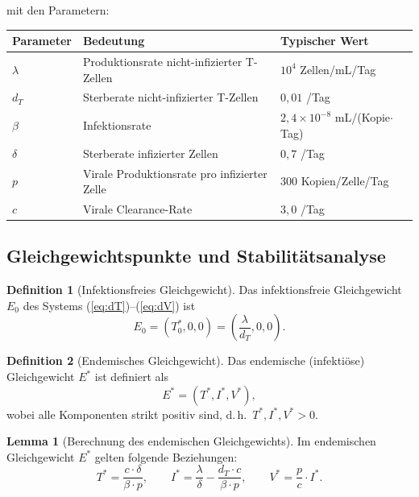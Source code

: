 ﻿\documentclass[a4paper,12pt]{article}
\theoremstyle{definition}
\newtheorem{definition}{Definition}
\newtheorem{lemma}{Lemma}
\begin{document}
mit den Parametern:
\begin{center}
\begin{tabular}{lll}
\toprule
\textbf{Parameter} & \textbf{Bedeutung} & \textbf{Typischer Wert} \\
\midrule
$\lambda$  & Produktionsrate nicht-infizierter T-Zellen  & $10^4$ Zellen/mL/Tag \\
$d_T$      & Sterberate nicht-infizierter T-Zellen       & $0{,}01$ /Tag \\
$\beta$    & Infektionsrate                              & $2{,}4 \times 10^{-8}$ mL/(Kopie$\cdot$Tag) \\
$\delta$   & Sterberate infizierter Zellen               & $0{,}7$ /Tag \\
$p$        & Virale Produktionsrate pro infizierter Zelle& 300 Kopien/Zelle/Tag \\
$c$        & Virale Clearance-Rate                       & $3{,}0$ /Tag \\
\bottomrule
\end{tabular}
\end{center}

\subsection{Gleichgewichtspunkte und Stabilit\"atsanalyse}

\begin{definition}[Infektionsfreies Gleichgewicht]
Das infektionsfreie Gleichgewicht $E_0$ des Systems (\ref{eq:dT})--(\ref{eq:dV}) ist
\[
E_0 = \left(T_0^*, 0, 0\right) = \left(\frac{\lambda}{d_T}, 0, 0\right).
\]
\end{definition}

\begin{definition}[Endemisches Gleichgewicht]
Das endemische (infekti\"ose) Gleichgewicht $E^*$ ist definiert als
\[
E^* = (T^*, I^*, V^*),
\]
wobei alle Komponenten strikt positiv sind, d.\,h.\ $T^*, I^*, V^* > 0$.
\end{definition}

\begin{lemma}[Berechnung des endemischen Gleichgewichts]
\label{lem:eq_endemic}
Im endemischen Gleichgewicht $E^*$ gelten folgende Beziehungen:
\[
T^* = \frac{c \cdot \delta}{\beta \cdot p}, \qquad
I^* = \frac{\lambda}{{\delta}} - \frac{d_T \cdot c}{\beta \cdot p}, \qquad
V^* = \frac{p}{{c}} \cdot I^*.
\]
\end{lemma}
\end{document}
